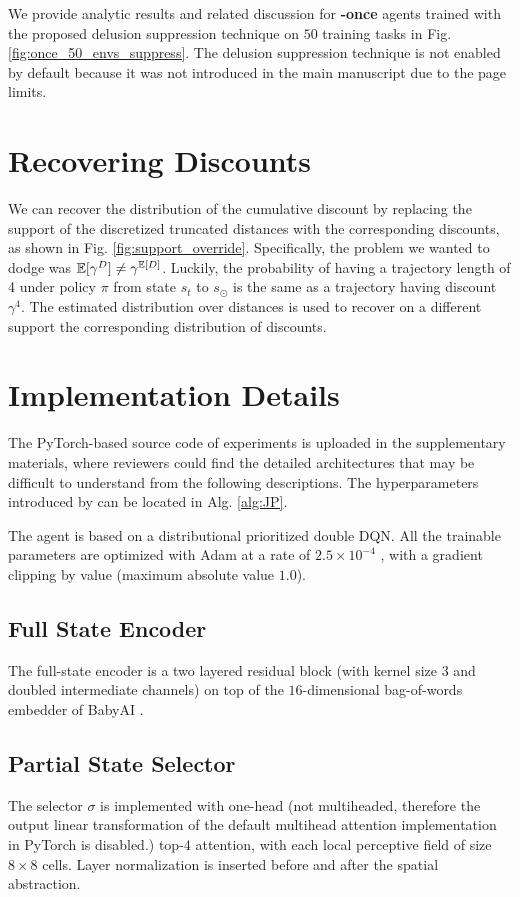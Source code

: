 We provide analytic results and related discussion for \textbf{\agentshort{}-once} agents trained with the proposed delusion suppression technique on $50$ training tasks in Fig. \ref{fig:once_50_envs_suppress}. The delusion suppression technique is not enabled by default because it was not introduced in the main manuscript due to the page limits. 

\section{Recovering Discounts}

We can recover the distribution of the cumulative discount by replacing the support of the discretized truncated distances with the corresponding discounts, as shown in Fig. \ref{fig:support_override}. Specifically, the problem we wanted to dodge was $\mathbb{E}[\gamma^D] \neq \gamma^{\mathbb{E}[D]}$. Luckily, the probability of having a trajectory length of 4 under policy $\pi$ from state $s_t$ to  $s_\odot$ is the same as a trajectory having discount $\gamma ^ 4$. The estimated distribution over distances is used to recover on a different support the corresponding distribution of discounts.



\section{\agentshort{} Implementation Details}
\label{sec:details_implement}
The PyTorch-based source code of experiments is uploaded in the supplementary materials, where reviewers could find the detailed architectures that may be difficult to understand from the following descriptions. The hyperparameters introduced by \agentshort{} can be located in Alg. \ref{alg:JP}.

The agent is based on a distributional prioritized double DQN. All the trainable parameters are optimized with Adam at a rate of $2.5\times10^{-4}$ \citep{kingma2014adam}, with a gradient clipping by value (maximum absolute value $1.0$).

\subsection{Full State Encoder}
The full-state encoder is a two layered residual block (with kernel size 3 and doubled intermediate channels) on top of the $16$-dimensional bag-of-words embedder of BabyAI \citep{hui2020babyai}.

\subsection{Partial State Selector}
The selector $\sigma$ is implemented with one-head (not multiheaded, therefore the output linear transformation of the default multihead attention implementation in PyTorch is disabled.) top-$4$ attention, with each local perceptive field of size $8\times8$ cells. Layer normalization \citep{ba2016layer} is inserted before and after the spatial abstraction.

